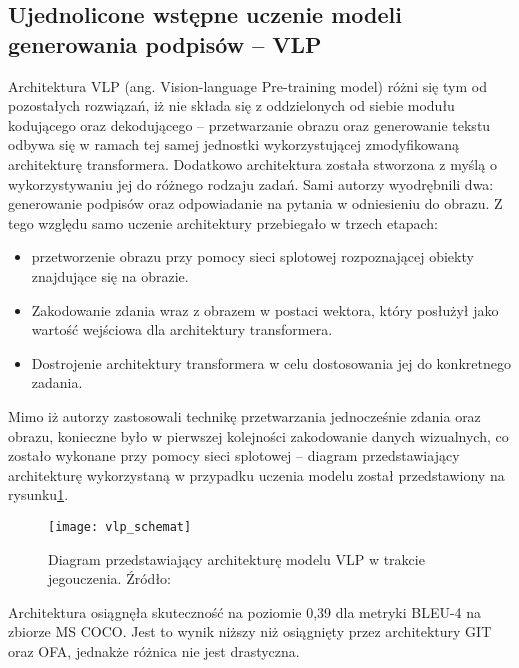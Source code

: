 \subsection{Ujednolicone wstępne uczenie modeli generowania podpisów -- VLP}
Architektura VLP \cite{vlp} (ang. Vision-language Pre-training model) różni się tym od pozostałych rozwiązań, iż nie składa się z oddzielonych od siebie modułu kodującego oraz dekodującego -- przetwarzanie obrazu oraz generowanie tekstu odbywa się w ramach tej samej jednostki wykorzystującej zmodyfikowaną architekturę transformera. Dodatkowo architektura została stworzona z myślą o wykorzystywaniu jej do różnego rodzaju zadań. Sami autorzy wyodrębnili dwa: generowanie podpisów oraz odpowiadanie na pytania w odniesieniu do obrazu. Z tego względu samo uczenie architektury przebiegało w trzech etapach:
\begin{itemize}
  \item przetworzenie obrazu przy pomocy sieci splotowej rozpoznającej obiekty znajdujące się na obrazie.
  \item Zakodowanie zdania wraz z obrazem w postaci wektora, który posłużył jako wartość wejściowa dla architektury transformera.
  \item Dostrojenie architektury transformera w celu dostosowania jej do konkretnego zadania.
\end{itemize}
Mimo iż autorzy zastosowali technikę przetwarzania jednocześnie zdania oraz obrazu, konieczne było w pierwszej kolejności zakodowanie danych wizualnych, co zostało wykonane przy pomocy sieci splotowej -- diagram przedstawiający architekturę wykorzystaną w przypadku uczenia modelu został przedstawiony na rysunku\ref{fig:vlp-schemat}.
\begin{figure}[H]
  \centering
  \texttt{[image: vlp\_schemat]}
  \caption{Diagram przedstawiający architekturę modelu VLP w trakcie jegouczenia. Źródło: \cite{vlp}}
  \label{fig:vlp-schemat}
\end{figure}
\noindent Architektura osiągnęła skuteczność na poziomie 0,39 dla metryki BLEU-4 na zbiorze MS COCO. Jest to wynik niższy niż osiągnięty przez architektury GIT oraz OFA, jednakże różnica nie jest drastyczna.

